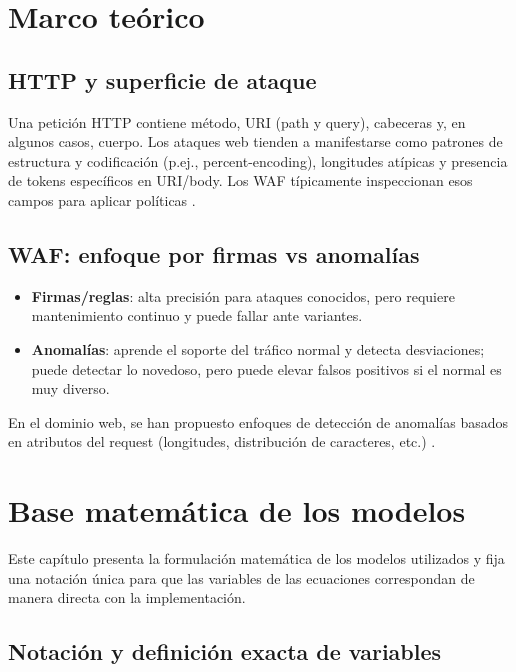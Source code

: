 \documentclass[12pt,oneside]{report}
\begin{document}
\chapter{Marco teórico}

\section{HTTP y superficie de ataque}
Una petición HTTP contiene método, URI (path y query), cabeceras y, en algunos casos, cuerpo. Los ataques web tienden a manifestarse como
patrones de estructura y codificación (p.ej., percent-encoding), longitudes atípicas y presencia de tokens específicos en URI/body.
Los WAF típicamente inspeccionan esos campos para aplicar políticas \cite{owasp_waf,modsecurity_site}.

\section{WAF: enfoque por firmas vs anomalías}
\begin{itemize}[leftmargin=*]
  \item \textbf{Firmas/reglas}: alta precisión para ataques conocidos, pero requiere mantenimiento continuo y puede fallar ante variantes.
  \item \textbf{Anomalías}: aprende el soporte del tráfico normal y detecta desviaciones; puede detectar lo novedoso, pero puede elevar falsos positivos si el normal es muy diverso.
\end{itemize}
En el dominio web, se han propuesto enfoques de detección de anomalías basados en atributos del request (longitudes, distribución de caracteres, etc.) \cite{kruegel_vigna_2003}.

\chapter{Base matemática de los modelos}

Este capítulo presenta la formulación matemática de los modelos utilizados y fija una notación única
para que las variables de las ecuaciones correspondan de manera directa con la implementación.

\section{Notación y definición exacta de variables}
\end{document}
